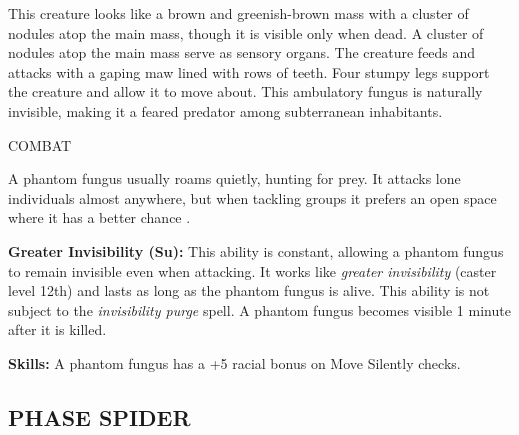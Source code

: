 \documentclass{article}
\begin{document}
This creature looks like a brown and greenish-brown mass with a cluster of nodules 
atop the main mass, though it is visible only when dead. A cluster of nodules atop 
the main mass serve as sensory organs. The creature feeds and attacks with a gaping 
maw lined with rows of teeth. Four stumpy legs support the creature and allow it 
to move about. This ambulatory fungus is naturally invisible, making it a feared 
predator among subterranean inhabitants.

COMBAT

A phantom fungus usually roams quietly, hunting for prey. It attacks lone individuals 
almost anywhere, but when tackling groups it prefers an open space where it has 
a better chance .

\textbf{Greater Invisibility (Su):} This ability is constant, allowing a phantom 
fungus to remain invisible even when attacking. It works like \textit{greater invisibility 
}(caster level 12th) and lasts as long as the phantom fungus is alive. This ability 
is not subject to the \textit{invisibility purge }spell. A phantom fungus becomes 
visible 1 minute after it is killed.

\textbf{Skills:} A phantom fungus has a +5 racial bonus on Move Silently checks.

\vspace{12pt}
\subsection*{{\LARGE{}PHASE SPIDER}}
\end{document}
